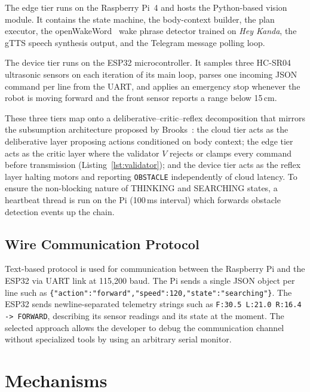 \documentclass[conference]{IEEEtran}
\begin{document}
The edge tier runs on the Raspberry Pi~4 and hosts the Python-based vision module. It contains the state machine, the body-context builder, the plan executor, the openWakeWord~\cite{openwakeword2024} wake phrase detector trained on \emph{Hey Kanda}, the gTTS speech synthesis output, and the Telegram message polling loop.

The device tier runs on the ESP32 microcontroller. It samples three HC-SR04 ultrasonic sensors on each iteration of its main loop, parses one incoming JSON command per line from the UART, and applies an emergency stop whenever the robot is moving forward and the front sensor reports a range below 15\,cm.

These three tiers map onto a deliberative--critic--reflex decomposition that mirrors the subsumption architecture proposed by Brooks~\cite{brooks1986robust}: the cloud tier acts as the deliberative layer proposing actions conditioned on body context; the edge tier acts as the critic layer where the validator $V$ rejects or clamps every command before transmission (Listing~\ref{lst:validator}); and the device tier acts as the reflex layer halting motors and reporting \texttt{OBSTACLE} independently of cloud latency. To ensure the non-blocking nature of THINKING and SEARCHING states, a heartbeat thread is run on the Pi (100\,ms interval) which forwards obstacle detection events up the chain.

\subsection{Wire Communication Protocol}

Text-based protocol is used for communication between the Raspberry Pi and the ESP32 via UART link at 115{,}200 baud. The Pi sends a single JSON object per line such as {\scriptsize\texttt{\{"action":"forward","speed":120,"state":"searching"\}}}. The ESP32 sends newline-separated telemetry strings such as {\scriptsize\texttt{F:30.5 L:21.0 R:16.4 -> FORWARD}}, describing its sensor readings and its state at the moment. The selected approach allows the developer to debug the communication channel without specialized tools by using an arbitrary serial monitor.

\section{Mechanisms}
\label{sec:methodology}
\end{document}
